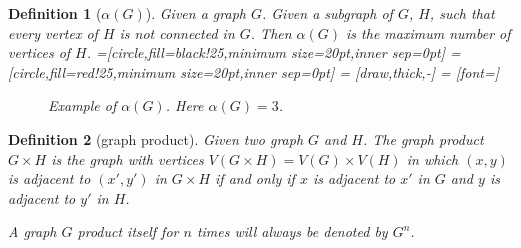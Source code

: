 \documentclass{article}
\newtheorem{definition}{Definition}[section]
\begin{document}
      \begin{definition}[$ \alpha(G) $] \label{def:alphaG}
            Given a graph $ G $. Given a subgraph of $ G $, $ H $, such that every vertex of $ H $ is not connected in $ G $. Then $ \alpha(G) $ is the maximum number of vertices of $ H $.
            =[circle,fill=black!25,minimum size=20pt,inner sep=0pt]
            =[circle,fill=red!25,minimum size=20pt,inner sep=0pt]
             = [draw,thick,-]
             = [font=\small]
            \begin{figure}[h!]
                    \label{fig:alphaGExample}
                    \caption{Example of $ \alpha(G) $. Here $ \alpha(G) = 3 $.}
            \end{figure}
      \end{definition}

      \begin{definition}[graph product]\label{def:graphProduct}
            Given two graph $ G $ and $ H $. The graph product $ G \times H $ is the graph with vertices $ V(G \times H) = V(G) \times V(H) $ in which $ (x,y) $ is adjacent to $ (x',y') $ in $ G \times H $ if and only if $ x $ is adjacent to $ x' $ in $ G $ and $ y $ is adjacent to $ y' $ in $ H $.

            A graph $ G $ product itself for $ n $ times will always be denoted by $ G^n $.
      \end{definition}
\end{document}
